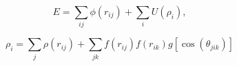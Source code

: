 \documentclass[12pt]{article}
\begin{document}
$$
   E=\sum_{ij}\phi(r_{ij})+\sum_{i}U(\rho_{i}),
$$

$$
   \rho_{i}=\sum_{j}\rho(r_{ij})+\sum_{jk}f(r_{ij})f(r_{ik})g[\cos(\theta_{jik})]
$$
\end{document}
